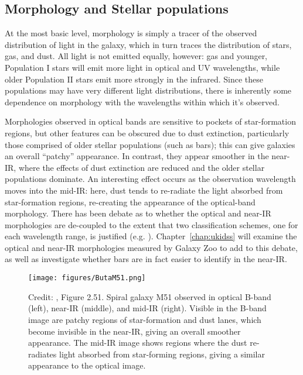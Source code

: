 \subsection{Morphology and Stellar populations}

At the most basic level, morphology is simply a tracer of the observed distribution of light in the galaxy, which in turn traces the distribution of stars, gas, and dust. All light is not emitted equally, however: gas and younger, Population I stars will emit more light in optical and UV wavelengths, while older Population II stars emit more strongly in the infrared. Since these populations may have very different light distributions, there is inherently some dependence on morphology with the wavelengths within which it's observed. 

Morphologies observed in optical bands are sensitive to pockets of star-formation regions, but other features can be obscured due to dust extinction, particularly those comprised of older stellar populations (such as bars); this can give galaxies an overall ``patchy'' appearance. In contrast, they appear smoother in the near-IR, where the effects of dust extinction are reduced and the older stellar populations dominate. An interesting effect occurs as the observation wavelength moves into the mid-IR: here, dust tends to re-radiate the light absorbed from star-formation regions, re-creating the appearance of the optical-band morphology. There has been debate as to whether the optical and near-IR morphologies are de-coupled to the extent that two classification schemes, one for each wavelength range, is justified (e.g. \citet{Block1999}). Chapter~\ref{chap:ukidss} will examine the optical and near-IR morphologies measured by Galaxy Zoo to add to this debate, as well as investigate whether bars are in fact easier to identify in the near-IR.

\begin{figure}
\centering
\texttt{[image: figures/ButaM51.png]}
\caption{Credit: \citet{Buta2013}, Figure 2.51. Spiral galaxy M51 observed in optical B-band (left), near-IR (middle), and mid-IR (right). Visible in the B-band image are patchy regions of star-formation and dust lanes, which become invisible in the near-IR, giving an overall smoother appearance. The mid-IR image shows regions where the dust re-radiates light absorbed from star-forming regions, giving a similar appearance to the optical image. }
\label{fig:buta51}
\end{figure} 

